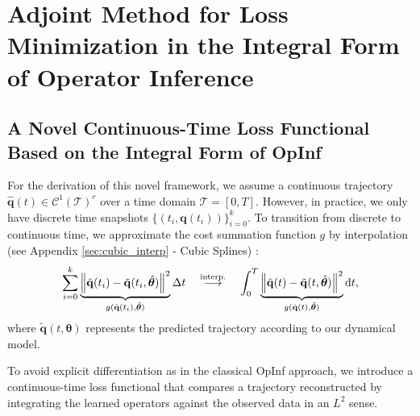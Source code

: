 \chapter{Adjoint Method for Loss Minimization in the Integral Form of Operator Inference}
\label{chap:methodology}



\section{A Novel Continuous-Time Loss Functional Based on the Integral Form of OpInf}

For the derivation of this novel framework, we assume a continuous trajectory $\hat{\mathbf{q}}(t) \in \mathcal{C}^1(\mathcal{T})^r$ over a time domain $\mathcal{T} = [0,T] $. However, in practice, we only have discrete time snapshots $\displaystyle\{ (t_i, \mathbf{q}(t_i)) \}_{i=0}^k$. To transition from discrete to continuous time, we approximate the cost summation function $g$ by interpolation (see Appendix \ref{sec:cubic_interp} - Cubic Splines) \cite{de1978practical}:\\
$$\sum_{i=0}^k \underbrace{\norm{\hat{\mathbf{q}}(t_i)-\tilde{\mathbf{q}}(t_i,\hat{\bm\theta})}^2}_{g(\hat{\mathbf{q}}(t_i),\hat{\bm\theta})}\Delta t 
\quad \overset{\text{interp.}}{\longrightarrow} \quad  
\int_0^T \underbrace{\norm{\hat{\mathbf{q}}(t)-\tilde{\mathbf{q}}(t,\hat{\bm\theta})}^2}_{g(\hat{\mathbf{q}}(t),\hat{\bm\theta})} \dd t,
$$
where $\tilde{\mathbf{q}}(t,\bm\theta)$ represents the predicted trajectory according to our dynamical model.

To avoid explicit differentiation as in the classical OpInf approach, we introduce a continuous-time loss functional that compares a trajectory reconstructed by integrating the learned operators against the observed data in an $L^2$ sense.

